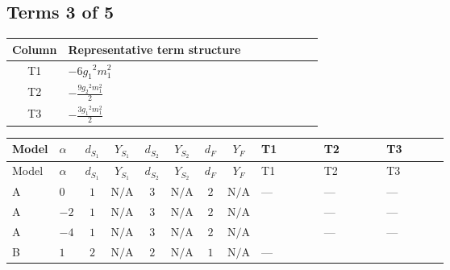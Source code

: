\documentclass[8pt]{article}
\begin{document}
\begin{landscape}
\subsection*{Terms 3 of 5}
\begin{center}
\begin{tabular}{@{}c >{\raggedright\arraybackslash}p{0.82\linewidth}@{}}
\toprule
Column & Representative term structure \\
\midrule
T1 & \(\displaystyle -6 {g_1}^2 {m_1^2}\) \\
\midrule
T2 & \(\displaystyle -\frac{9 {g_2}^2 {m_1^2}}{2}\) \\
\midrule
T3 & \(\displaystyle -\frac{3 {g_1}^2 {m_1^2}}{2}\) \\
\midrule
\bottomrule
\end{tabular}
\end{center}
\smallskip
\tiny
\begin{longtable}{@{}llcccccc >{\raggedright\arraybackslash}p{0.21\linewidth} >{\raggedright\arraybackslash}p{0.21\linewidth} >{\raggedright\arraybackslash}p{0.21\linewidth}@{}}
\toprule
Model & $\alpha$ & $d_{S_1}$ & $Y_{S_1}$ & $d_{S_2}$ & $Y_{S_2}$ & $d_F$ & $Y_F$ & T1 & T2 & T3 \\
\midrule
\endfirsthead
\toprule
Model & $\alpha$ & $d_{S_1}$ & $Y_{S_1}$ & $d_{S_2}$ & $Y_{S_2}$ & $d_F$ & $Y_F$ & T1 & T2 & T3 \\
\midrule
\endhead
A & $0$ & $1$ & $\text{N/A}$ & $3$ & $\text{N/A}$ & $2$ & $\text{N/A}$ & --- & --- & --- \\
\midrule
A & $-2$ & $1$ & $\text{N/A}$ & $3$ & $\text{N/A}$ & $2$ & $\text{N/A}$ & \scriptsize\adjustbox{max width=\linewidth}{$\begin{gathered} -6 {g_1}^2 {m_1^2}\end{gathered}$} & --- & --- \\
\midrule
A & $-4$ & $1$ & $\text{N/A}$ & $3$ & $\text{N/A}$ & $2$ & $\text{N/A}$ & \scriptsize\adjustbox{max width=\linewidth}{$\begin{gathered} -24 {g_1}^2 {m_1^2}\end{gathered}$} & --- & --- \\
\midrule
B & $1$ & $2$ & $\text{N/A}$ & $2$ & $\text{N/A}$ & $1$ & $\text{N/A}$ & --- & \scriptsize\adjustbox{max width=\linewidth}{$\begin{gathered} -\frac{9 {g_2}^2 {m_1^2}}{2}\end{gathered}$} & \scriptsize\adjustbox{max width=\linewidth}{$\begin{gathered} -\frac{3 {g_1}^2 {m_1^2}}{2}\end{gathered}$} \\

\end{longtable}
\end{landscape}
\end{document}
